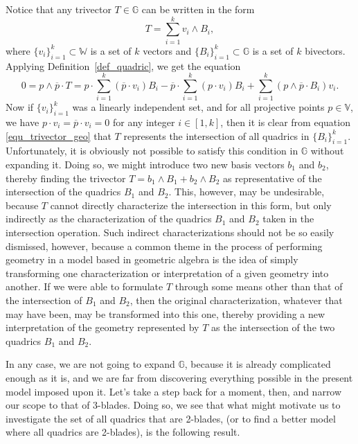 \documentclass{ecgd-l}
\newcommand{\G}{\mathbb{G}}
\newcommand{\V}{\mathbb{V}}
\newcommand{\W}{\mathbb{W}}
\theoremstyle{definition}
\theoremstyle{remark}
\numberwithin{equation}{section}
\begin{document}
Notice that any trivector $T\in\G$ can be written in the form
\begin{equation}
T = \sum_{i=1}^k v_i\wedge B_i,
\end{equation}
where $\{v_i\}_{i=1}^k\subset\W$ is a set of $k$ vectors and $\{B_i\}_{i=1}^k\subset\G$
is a set of $k$ bivectors.  Applying Definition~\ref{def_quadric}, we get the equation
\begin{equation}\label{equ_trivector_geo}
0 = p\wedge\overline{p}\cdot T =
p\cdot\sum_{i=1}^k(\overline{p}\cdot v_i)B_i -
\overline{p}\cdot\sum_{i=1}^k(p\cdot v_i)B_i +
\sum_{i=1}^k(p\wedge\overline{p}\cdot B_i)v_i.
\end{equation}
Now if $\{v_i\}_{i=1}^k$ was a linearly independent set, and for all projective points $p\in\V$, we have $p\cdot v_i=\overline{p}\cdot v_i=0$
for any integer $i\in[1,k]$, then it is clear
from equation \eqref{equ_trivector_geo} that $T$ represents the intersection of all quadrics in $\{B_i\}_{i=1}^k$.
Unfortunately, it is obviously not possible to satisfy this condition in $\G$ without expanding it.
Doing so, we might introduce two new basis vectors $b_1$ and $b_2$, thereby finding the trivector
$T=b_1\wedge B_1+b_2\wedge B_2$ as representative of the intersection of the quadrics $B_1$ and $B_2$.
This, however, may be undesirable, because $T$ cannot directly characterize the intersection in this form, but
only indirectly as the characterization of the quadrics $B_1$ and $B_2$ taken in the intersection operation.
Such indirect characterizations should not be so easily dismissed, however, because a common theme
in the process of performing geometry in a model based in geometric algebra is the idea of simply transforming
one characterization or interpretation of a given geometry into another.  If we were able to formulate $T$ through some means
other than that of the intersection of $B_1$ and $B_2$, then the original characterization, whatever that may
have been, may be transformed into
this one, thereby providing a new interpretation of the geometry represented by $T$ as the intersection
of the two quadrics $B_1$ and $B_2$.

In any case, we are not going to expand $\G$, because it is already complicated enough as it is, and we
are far from discovering everything possible in the present model imposed upon it.
Let's take a step back for a moment, then, and narrow our scope to that of 3-blades.
Doing so, we see that
what might motivate us to investigate the set of all quadrics that are 2-blades, (or to find
a better model where all quadrics are 2-blades), is the following result.
\end{document}
